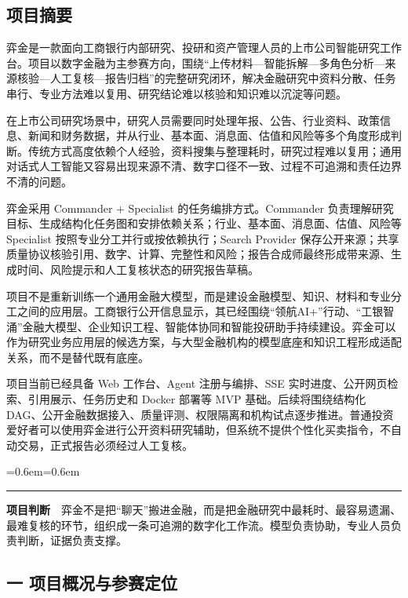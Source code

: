 \documentclass[a4paper,12pt,fontset=none]{ctexart}
\renewenvironment{quote}{%
  \par\vspace{0.45em}%
  \leftskip=0.6em\rightskip=0.6em
  \noindent\color{icbcred}\rule{3pt}{1.15em}\hspace{0.55em}%
  \small\color{deepnavy!85}\itshape\ignorespaces
}{%
  \par\vspace{0.45em}%
}
\begin{document}
\subsection{项目摘要}\label{ux9879ux76eeux6458ux8981}

弈金是一款面向工商银行内部研究、投研和资产管理人员的上市公司智能研究工作台。项目以数字金融为主参赛方向，围绕``上传材料---智能拆解---多角色分析---来源核验---人工复核---报告归档''的完整研究闭环，解决金融研究中资料分散、任务串行、专业方法难以复用、研究结论难以核验和知识难以沉淀等问题。

在上市公司研究场景中，研究人员需要同时处理年报、公告、行业资料、政策信息、新闻和财务数据，并从行业、基本面、消息面、估值和风险等多个角度形成判断。传统方式高度依赖个人经验，资料搜集与整理耗时，研究过程难以复用；通用对话式人工智能又容易出现来源不清、数字口径不一致、过程不可追溯和责任边界不清的问题。

弈金采用 Commander + Specialist 的任务编排方式。Commander
负责理解研究目标、生成结构化任务图和安排依赖关系；行业、基本面、消息面、估值、风险等
Specialist 按照专业分工并行或按依赖执行；Search Provider
保存公开来源；共享质量协议核验引用、数字、计算、完整性和风险；报告合成师最终形成带来源、生成时间、风险提示和人工复核状态的研究报告草稿。

项目不是重新训练一个通用金融大模型，而是建设金融模型、知识、材料和专业分工之间的应用层。工商银行公开信息显示，其已经围绕``领航AI+''行动、``工银智涌''金融大模型、企业知识工程、智能体协同和智能投研助手持续建设。弈金可以作为研究业务应用层的候选方案，与大型金融机构的模型底座和知识工程形成适配关系，而不是替代既有底座。

项目当前已经具备 Web 工作台、Agent 注册与编排、SSE
实时进度、公开网页检索、引用展示、任务历史和 Docker 部署等 MVP
基础。后续将围绕结构化
DAG、公开金融数据接入、质量评测、权限隔离和机构试点逐步推进。普通投资爱好者可以使用弈金进行公开资料研究辅助，但系统不提供个性化买卖指令，不自动交易，正式报告必须经过人工复核。

\begin{quote}
\textbf{项目判断}　弈金不是把``聊天''搬进金融，而是把金融研究中最耗时、最容易遗漏、最难复核的环节，组织成一条可追溯的数字化工作流。模型负责协助，专业人员负责判断，证据负责支撑。
\end{quote}

\subsection{一
项目概况与参赛定位}\label{ux4e00-ux9879ux76eeux6982ux51b5ux4e0eux53c2ux8d5bux5b9aux4f4d}
\end{document}
